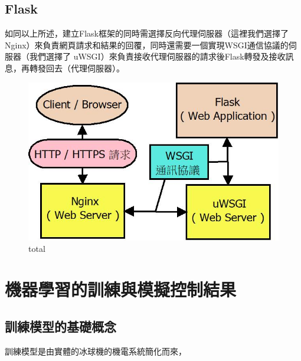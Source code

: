 \documentclass[14pt,a4paper]{report}  %
\begin{document}
\section{Flask}
 
 如同以上所述，建立Flask框架的同時需選擇反向代理伺服器（這裡我們選擇了Nginx）來負責網頁請求和結果的回覆，同時還需要一個實現WSGI通信協議的伺服器（我們選擇了 uWSGI）來負責接收代理伺服器的請求後Flask轉發及接收訊息，再轉發回去（代理伺服器）。\\
 
\begin{figure}[hbt!]
\begin{center}
\includegraphics[scale=0.74]{total}
\caption{\Large total}\label{total}
\end{center}
\end{figure}

\chapter{機器學習的訓練與模擬控制結果}
\section{訓練模型的基礎概念}
 訓練模型是由實體的冰球機的機電系統簡化而來，
\end{document}
